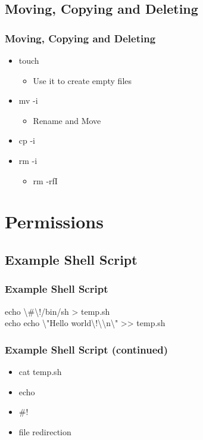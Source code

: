 \documentclass[hyperref={pdfpagelabels=false}]{beamer}
\begin{document}
\subsection{Moving, Copying and Deleting}
\frame
{
    \frametitle{Moving, Copying and Deleting}
    \begin{itemize}
    \item{touch}
        \begin{itemize}
        \item{Use it to create empty files}
        \end{itemize}
    \item{mv -i}
	\begin{itemize}
        \item{Rename and Move}
        \end{itemize}
    \item{cp -i}
    \item{rm -i}
	\begin{itemize}
        \item{rm -rfI}
        \end{itemize}
    \end{itemize}
}
\section{Permissions}
\subsection{Example Shell Script}
\frame
{	
    \frametitle{Example Shell Script}
    echo {\textbackslash}#{\textbackslash}!/bin/sh > temp.sh\\
    echo echo {\textbackslash}"Hello world{\textbackslash}!{\textbackslash}{\textbackslash}n{\textbackslash}" >> temp.sh
}
\frame
{
    \frametitle{Example Shell Script (continued)}
    \begin{itemize}
    \item{cat temp.sh}
    \item{echo}
    \item{#!}
    \item{file redirection}
    \end{itemize}

}
\end{document}
